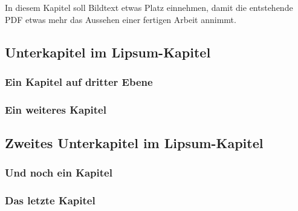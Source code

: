 In diesem Kapitel soll Bildtext etwas Platz einnehmen,
damit die entstehende PDF etwas mehr das Aussehen 
einer fertigen Arbeit annimmt.

\subsection{Unterkapitel im Lipsum-Kapitel}
  \lipsum[1-2]
  \subsubsection{Ein Kapitel auf dritter Ebene}
    \lipsum[3-5]
  \subsubsection{Ein weiteres Kapitel}
    \lipsum[4-6]

\subsection{Zweites Unterkapitel im Lipsum-Kapitel}
  \lipsum[7-8]
  \subsubsection{Und noch ein Kapitel}
    \lipsum[9-10]
  \subsubsection{Das letzte Kapitel}
    \lipsum[11]